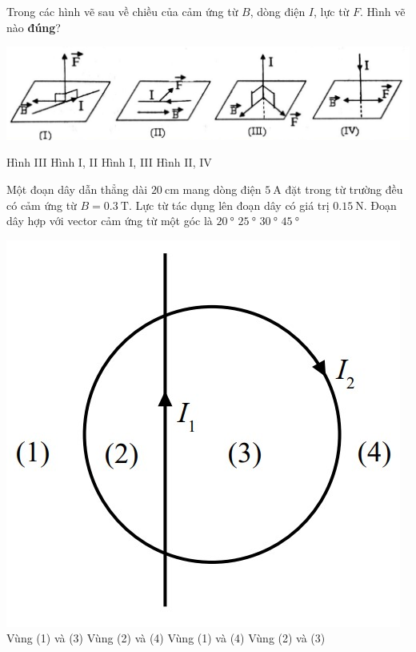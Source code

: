 \begin{ex}
	Trong các hình vẽ sau về chiều của cảm ứng từ $B$, dòng điện $I$, lực từ $F$. Hình vẽ nào \textbf{đúng}?
	\begin{center}
		\includegraphics[width=0.7\linewidth]{figs/VN12-Y24-PH-SYL-025P-1}
	\end{center}
	\choice
	{Hình III}
	{Hình I, II}
	{\True Hình I, III}
	{Hình II, IV}
	\loigiai{}
\end{ex}
\begin{ex}
	Một đoạn dây dẫn thẳng dài $\SI{20}{\centi\meter}$ mang dòng điện $\SI{5}{\ampere}$ đặt trong từ trường đều có cảm ứng từ $B=\SI{0.3}{\tesla}$. Lực từ tác dụng lên đoạn dây có giá trị $\SI{0.15}{\newton}$. Đoạn dây hợp với vector cảm ứng từ một góc là
	\choice
	{$\SI{20}{\degree}$}
	{$\SI{25}{\degree}$}
	{\True $\SI{30}{\degree}$}
	{$\SI{45}{\degree}$}
\end{ex}
\begin{ex}
	{\includegraphics[width=0.4\linewidth]{figs/VN12-Y24-PH-SYL-025P-2}}
	\choice
	{Vùng (1) và (3)}
	{\True Vùng (2) và (4)}
	{Vùng (1) và (4)}
	{Vùng (2) và (3)}
	\loigiai{}
\end{ex}
